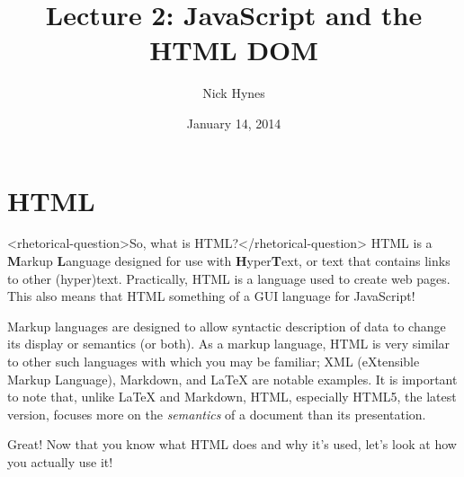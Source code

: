 \documentclass[12pt]{article}
\begin{document}
\title{Lecture 2: JavaScript and the HTML DOM}
\author{Nick Hynes}
\date{January 14, 2014}

\maketitle

\begin{spacing}{0}
\setcounter{tocdepth}{1}
\tableofcontents
\end{spacing}

\section{HTML}
\textless rhetorical-question\textgreater So, what is HTML?\textless /rhetorical-question\textgreater{} HTML is a \textbf{M}arkup \textbf{L}anguage designed for use with \textbf{H}yper\textbf{T}ext, or text that contains links to other (hyper)text. Practically, HTML is a language used to create web pages. This also means that HTML something of a GUI language for JavaScript!
\par
Markup languages are designed to allow syntactic description of data to change its display or semantics (or both). As a markup language, HTML is very similar to other such languages with which you may be familiar; XML (eXtensible Markup Language), Markdown, and LaTeX are notable examples. It is important to note that, unlike LaTeX and Markdown, HTML, especially HTML5, the latest version, focuses more on the \emph{semantics} of a document than its presentation.
\par
Great! Now that you know what HTML does and why it's used, let's look at how you actually use it!
\end{document}
